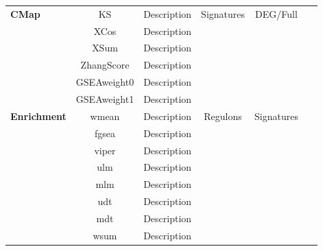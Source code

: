 \begin{xltabular}{\textwidth}{Xccccc}
    \midrule
\textbf{CMap}       & KS             & Description & Signatures   & DEG/Full     & ~\cite{cmap} \\
                    & XCos           & Description &              &              & ~\cite{cmap} \\
                    & XSum           & Description &              &              & ~\cite{cmap} \\
                    & ZhangScore     & Description &              &              & ~\cite{cmap} \\
                    & GSEAweight0    & Description &              &              & ~\cite{cmap} \\
                    & GSEAweight1    & Description &              &              & ~\cite{cmap} \\
    \midrule
\textbf{Enrichment} & wmean   & Description  & Regulons     & Signatures  & ~\cite{cbdd} \\
                    & fgsea   & Description  &              &             & ~\cite{fgsea} \\
                    & viper   & Description  &              &             & ~\cite{viper} \\
                    & ulm     & Description  &              &             & ~\cite{cbdd} \\
                    & mlm     & Description  &              &             & ~\cite{cbdd} \\
                    & udt     & Description  &              &             & ~\cite{cbdd} \\
                    & mdt     & Description  &              &             & ~\cite{cbdd} \\
                    & wsum    & Description  &              &             & ~\cite{fgsea} \\
    \bottomrule
    \end{xltabular}
\egroup





